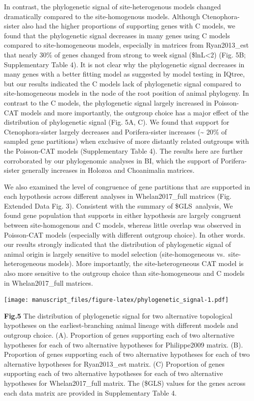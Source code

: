 \documentclass[]{article}
\begin{document}
In contrast, the phylogenetic signal of site-heterogenous models changed
dramatically compared to the site-homogenous models. Although
Ctenophora-sister also had the higher proportions of supporting genes
with C models, we found that the phylogenetic signal decreases in many
genes using C models compared to site-homogeneous models, especially in
matrices from Ryan2013\_est that nearly 30\% of genes changed from
strong to week signal (\Delta\$lnL\textless{}2) (Fig. 5B; Supplementary
Table 4). It is not clear why the phylogenetic signal decreases in many
genes with a better fitting model as suggested by model testing in
IQtree, but our results indicated the C models lack of phylogenetic
signal compared to site-homogeneous models in the node of the root
position of animal phylogeny. In contrast to the C models, the
phylogenetic signal largely increased in Poisson-CAT models and more
importantly, the outgroup choice has a major effect of the distribution
of phylogenetic signal (Fig. 5A, C). We found that support for
Ctenophora-sister largely decreases and Porifera-sister increases
(\textasciitilde{} 20\% of sampled gene partitions) when exclusive of
more distantly related outgroups with the Poisson-CAT models
(Supplementary Table 4). The results here are further corroborated by
our phylogenomic analyses in BI, which the support of Porifera-sister
generally increases in Holozoa and Choanimalia matrices.

We also examined the level of congruence of gene partitions that are
supported in each hypothesis across different analyses in
Whelan2017\_full matrices (Fig. Extended Data Fig. 3). Consistent with
the summary of \Delta\$GLS~analysis, We found gene population that
supports in either hypothesis are largely congruent between
site-homogenous and C models, whereas little overlap was observed in
Poisson-CAT models (especially with different outgroup choice). In other
words. our results strongly indicated that the distribution of
phylogenetic signal of animal origin is largely sensitive to model
selection (site-homogeneous vs.~site-heterogeneous models). More
importantly, the site-heterogeneous CAT model is also more sensitive to
the outgroup choice than site-homogeneous and C models in
Whelan2017\_full matrices.

\texttt{[image: manuscript\_files/figure-latex/phylogenetic\_signal-1.pdf]}

\textbf{Fig.5} The distribution of phylogenetic signal for two
alternative topological hypotheses on the earliest-branching animal
lineage with different models and outgroup choice. (A). Proportion of
genes supporting each of two alternative hypotheses for each of two
alternative hypotheses for Philippe2009 matrix. (B). Proportion of genes
supporting each of two alternative hypotheses for each of two
alternative hypotheses for Ryan2013\_est matrix. (C) Proportion of genes
supporting each of two alternative hypotheses for each of two
alternative hypotheses for Whelan2017\_full matrix. The (\Delta\$GLS)
values for the genes across each data matrix are provided in
Supplementary Table 4.
\end{document}
